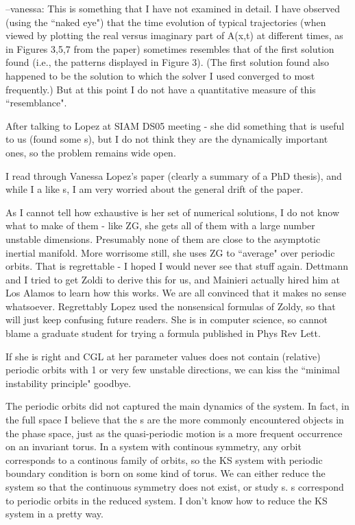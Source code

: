 --vanessa:
This is something that I have not examined in detail.  I have observed (using
the ``naked eye") that the time evolution of typical trajectories (when viewed
by plotting the real versus imaginary part of A(x,t) at different times, as in
Figures 3,5,7 from the paper) sometimes resembles that of the first solution
found (i.e., the patterns displayed in Figure 3). (The first solution
found also happened to be the solution to which the solver I used
converged to most frequently.)  But at this point I do not have a
quantitative measure of this ``resemblance".

After talking to Lopez at SIAM DS05 meeting - she did something that
is useful to us (found some {\rpo s}), but I do not think
they are the dynamically important ones, so the problem remains wide open.

I read through
Vanessa Lopez's paper (clearly a summary of a PhD thesis), and while I
a like {\rpo s}, I am very worried about the general drift
of the paper.

As I cannot tell how exhaustive is her set of numerical solutions, I do
not know what to make of them - like ZG, she gets all of them with a large
number unstable dimensions. Presumably none of them are close to the
asymptotic inertial manifold. More worrisome still, she uses ZG to
``average" over periodic orbits. That is regrettable - I hoped I would
never see that stuff again. Dettmann and I tried to get Zoldi to
derive this for us, and Mainieri actually hired him at Los Alamos to learn
how this works. We are all convinced that it makes no sense whatsoever.
Regrettably Lopez used the nonsensical formulas of Zoldy, so that will
just keep confusing future readers. 
She is in computer science, so cannot
blame a graduate student for trying a formula published in Phys Rev Lett.


If she is right and CGL at her parameter values does not contain
(relative) periodic orbits with 1 or very few unstable directions, we can
kiss the ``minimal instability principle" goodbye.

The 
periodic orbits
did not captured the main dynamics of the system. In fact, in the full
space I believe that the {\rpo s} are the more commonly
encountered objects in the phase space, just as the quasi-periodic motion is a
more frequent occurrence on an invariant torus. In a system with continous
symmetry, any orbit corresponds to a continous family of orbits, so the KS
system with periodic boundary condition is born on some kind of torus. We can
either reduce the system so that the continuous symmetry does not exist, or
study {\rpo s}. {\Rpo s} correspond to periodic
orbits in the reduced system. I don't know how to reduce the KS system in a
pretty way.

